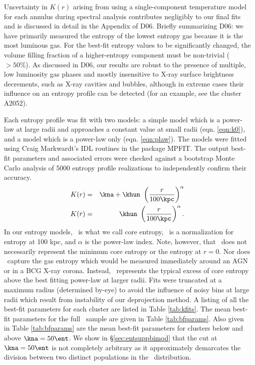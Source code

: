 Uncertainty in $K(r)$ arising from using a single-component
temperature model for each annulus during spectral analysis
contributes negligibly to our final fits and is discussed in detail in
the Appendix of D06. Briefly summarizing D06: we have primarily
measured the entropy of the lowest entropy gas because it is the most
luminous gas. For the best-fit entropy values to be significantly
changed, the volume filling fraction of a higher-entropy component
must be non-trivial ($> 50\%$). As discussed in D06, our results are
robust to the presence of multiple, low luminosity gas phases and
mostly insensitive to X-ray surface brightness decrements, such as
X-ray cavities and bubbles, although in extreme cases their influence
on an entropy profile can be detected (for an example, see the cluster
A2052).

Each entropy profile was fit with two models: a simple model which is
a power-law at large radii and approaches a constant value at small
radii (eqn. \ref{eqn:k0}), and a model which is a power-law only
(eqn. \ref{eqn:plaw}). The models were fitted using Craig Markwardt's
IDL routines in the package MPFIT. The output best-fit parameters and
associated errors were checked against a bootstrap Monte Carlo
analysis of 5000 entropy profile realizations to independently confirm
their accuracy.
\begin{eqnarray}
K(r) &=& \kna + \khun\ \left(\frac{r}{100 \kpc}\right)^{\alpha}\label{eqn:k0}\\
K(r) &=& \khun\ \left(\frac{r}{100 \kpc}\right)^{\alpha}\label{eqn:plaw}.
\end{eqnarray}
In our entropy models, \kna\ is what we call core entropy, \khun\ is a
normalization for entropy at 100 kpc, and $\alpha$ is the power-law
index. Note, however, that \kna\ does not necessarily represent the
minimum core entropy or the entropy at $r=0$. Nor does \kna\ capture
the gas entropy which would be measured immediately around an AGN or
in a BCG X-ray corona. Instead, \kna\ represents the typical excess of
core entropy above the best fitting power-law at larger radii. Fits
were truncated at a maximum radius (determined by-eye) to avoid the
influence of noisy bins at large radii which result from instability
of our deprojection method. A listing of all the best-fit parameters
for each cluster are listed in Table \ref{tab:kfits}. The mean
best-fit parameters for the full \accept\ sample are given in Table
\ref{tab:bfparams}. Also given in Table \ref{tab:bfparams} are the
mean best-fit parameters for clusters below and above $\kna = 50
\ent$. We show in \S\ref{sec:entsuppbimod} that the cut at $\kna=50 \ent$ is
not completely arbitrary as it approximately demarcates the division
between two distinct populations in the \kna\ distribution.

